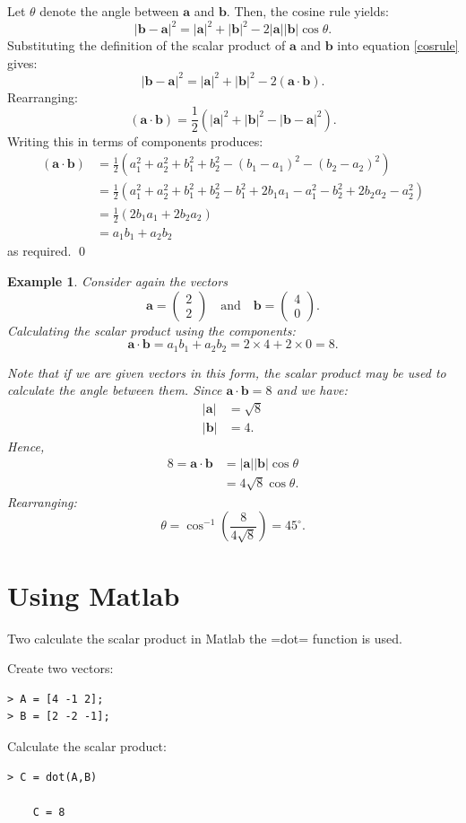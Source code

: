 \documentclass[12pt,a4paper]{article}
\theoremstyle{clearprint}
\renewenvironment{proof}[1][\proofname]
{\noindent{\bf {#1}.}\hspace*{1em}}%
{\qed\par}%
\newtheorem{example}[proposition]{Example}
\newcommand{\bvec}[1]{\mathrm{\mathbf{#1}}}
\newcommand{\cvec}[2]{\begin{pmatrix} #1 \\ #2 \end{pmatrix}}
\newcommand{\vmod}[1]{\lvert #1 \rvert}
\begin{document}
\begin{proof}
Let \(\theta\) denote the angle between \(\bvec{a}\) and \(\bvec{b}\). Then, the cosine rule yields:
\begin{equation}
\label{cosrule}
{\vmod{\bvec{b}-\bvec{a}}}^2 = {\vmod{\bvec{a}}}^2 + {\vmod{\bvec{b}}}^2 - 2\vmod{\bvec{a}}\vmod{\bvec{b}}\cos\theta. 
\end{equation} 
Substituting the definition of the scalar product of \(\bvec{a}\) and \(\bvec{b}\) into equation \ref{cosrule} gives:
\[
{\vmod{\bvec{b}-\bvec{a}}}^2 = {\vmod{\bvec{a}}}^2 + {\vmod{\bvec{b}}}^2 - 2\left(\bvec{a}\cdot \bvec{b}\right).
\] 
Rearranging:
\[
\left(\bvec{a}\cdot \bvec{b}\right) = \frac{1}{2}\left({\vmod{\bvec{a}}}^2 + {\vmod{\bvec{b}}}^2 - {\vmod{\bvec{b}-\bvec{a}}}^2\right).
\]
Writing this in terms of components produces:
\begin{align*}
\left(\bvec{a}\cdot \bvec{b}\right) &= \frac{1}{2}\left(a_1^2 + a_2^2 + b_1^2 + b_2^2 - (b_1 - a_1)^2 - (b_2 - a_2)^2\right)\\
\,&=\frac{1}{2}\left(a_1^2 + a_2^2 + b_1^2 + b_2^2 - b_1^2 + 2b_1a_1 - a_1^2 - b_2^2 + 2b_2a_2 - a_2^2\right)\\
\,&=\frac{1}{2}\left(2b_1a_1 + 2b_2a_2\right)\\
\,&=a_1b_1 + a_2b_2
\end{align*}
as required. 
\end{proof}

\begin{example}
Consider again the vectors
\[
\bvec{a} = \cvec{2}{2} \quad \text{and} \quad \bvec{b} = \cvec{4}{0}.
\]
Calculating the scalar product using the components:
\[
\bvec{a} \cdot \bvec{b} = a_1b_1 + a_2b_2 = 2\times 4 + 2\times 0 = 8. 
\]

Note that if we are given vectors in this form, the scalar product may be used to calculate the angle between them. Since \(\bvec{a} \cdot \bvec{b} = 8\) and we have:
\begin{align*}
\vmod{\bvec{a}} &= \sqrt{8}\\
\vmod{\bvec{b}} &= 4.
\end{align*}
Hence,
\begin{align*}
8 = \bvec{a} \cdot \bvec{b} &= \vmod{\bvec{a}}\vmod{\bvec{b}}\cos\theta\\
\,&= 4\sqrt{8}\cos \theta.
\end{align*}
Rearranging:
\[
\theta = \cos^{-1}\left(\frac{8}{4\sqrt{8}}\right) = {45}^{\circ}.
\]
\end{example}

\section{Using Matlab}

Two calculate the scalar product in Matlab the \spverb=dot= function is used. 

Create two vectors:
\begin{lstlisting}
> A = [4 -1 2];
> B = [2 -2 -1];
\end{lstlisting}

Calculate the scalar product:
\begin{lstlisting}
> C = dot(A,B)
    
    C = 8
\end{lstlisting}
\end{document}
